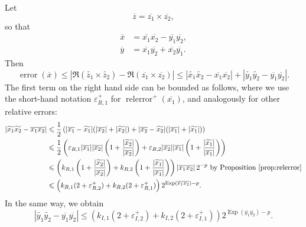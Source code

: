 \documentclass {article}
\newcommand {\corr}[1]{\widetilde {#1}}
\newcommand {\appro}[1]{\overline {#1}}
\DeclareMathOperator{\Exp}{\operatorname {Exp}}
\newcommand{\error}{\operatorname {error}}
\newcommand{\relerror}{\operatorname {relerror}}
\renewcommand {\epsilon}{\varepsilon}
\renewcommand {\leq}{\leqslant}
\begin{document}
Let
\[
\appro z = \appro {z_1} \times \appro {z_2},
\]
so that
\begin {align*}
\appro x & = \appro {x_1} \appro {x_2} - \appro {y_1} \appro {y_2}, \\
\appro y & = \appro {x_1} \appro {y_2} + \appro {x_2} \appro {y_1}.
\end {align*}
Then
\[
\error (\appro x)
\leq | \Re (\corr {z_1} \times \corr {z_2})
- \Re (\appro {z_1} \times \appro {z_2})|
\leq
| \corr {x_1} \corr {x_2} - \appro {x_1} \appro {x_2}|
+ | \corr {y_1} \corr {y_2} - \appro {y_1} \appro {y_2}|.
\]
The first term on the right hand side can be bounded as follows,
where we use the short-hand notation $\epsilon_{R, 1}^+$ for
$\relerror^+ (\appro {x_1})$, and analogously for other relative errors:
\begin{align*}
| \corr {x_1} \corr {x_2} - \appro {x_1} \appro {x_2}|
& \leq
\frac{1}{2} \left(
  |\appro {x_1} - \corr {x_1}| (|\appro {x_2}| + |\corr {x_2}|)
+ |\appro {x_2} - \corr {x_2}| (|\appro {x_1}| + |\corr {x_1}|)
\right)
\\
& \leq \frac {1}{2} \left(
  \epsilon_{R, 1} |\appro {x_1}| |\appro {x_2}|
  \left( 1 + \frac {|\corr {x_2}|}{|\appro {x_2}|} \right)
+ \epsilon_{R, 2} |\appro {x_2}| |\appro {x_1}|
  \left( 1 + \frac {|\corr {x_1}|}{|\appro {x_1}|} \right)
  \right)
\\
& \leq \left(
  k_{R, 1}
  \left( 1 + \frac {|\corr {x_2}|}{|\appro {x_2}|} \right)
+ k_{R, 2}
  \left( 1 + \frac {|\corr {x_1}|}{|\appro {x_1}|} \right)
  \right) |\appro {x_1} \appro {x_2}| \, 2^{-p}
  \text { by Proposition~\ref {prop:relerror}}
\\
& \leq \left(
   k_{R, 1} (2 + \epsilon_{R, 2}^+)
   + k_{R, 2} (2 + \epsilon_{R, 1}^+)
   \right) 2^{\Exp (\appro {x_1} \appro {x_2}) - p}.
\end{align*}
In the same way, we obtain
\[
| \corr {y_1} \corr {y_2} - \appro {y_1} \appro {y_2}|
\leq \left(
   k_{I, 1} (2 + \epsilon_{I, 2}^+)
   + k_{I, 2} (2 + \epsilon_{I, 1}^+)
   \right) 2^{\Exp (\appro {y_1} \appro {y_2}) - p}.
\]
\end{document}
